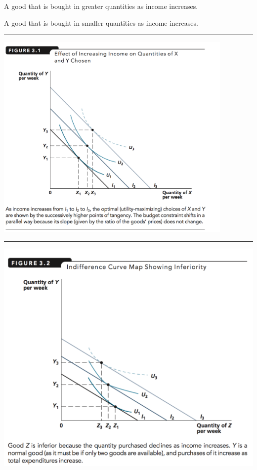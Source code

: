 \documentclass[]{article}
\providecommand{\tightlist}{%
  \setlength{\itemsep}{0pt}\setlength{\parskip}{0pt}}
\begin{document}
\begin{description}
\tightlist
\item[Normal good]
A good that is bought in greater quantities as income increases.
\item[Inferior good]
A good that is bought in smaller quantities as income increases.
\end{description}

\begin{center}\rule{0.5\linewidth}{\linethickness}\end{center}

\includegraphics[height=4in]{picsfigs/normalgood.png}


\begin{center}\rule{0.5\linewidth}{\linethickness}\end{center}

\includegraphics{picsfigs/inferiorgood.png}\\
\end{document}
